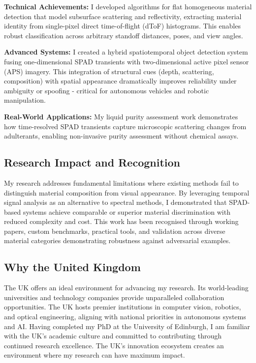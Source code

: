 \documentclass[12pt,a4paper]{article}
\begin{document}
\textbf{Technical Achievements:} I developed algorithms for flat homogeneous material detection that model subsurface scattering and reflectivity, extracting material identity from single-pixel direct time-of-flight (dToF) histograms. This enables robust classification across arbitrary standoff distances, poses, and view angles.

\textbf{Advanced Systems:} I created a hybrid spatiotemporal object detection system fusing one-dimensional SPAD transients with two-dimensional active pixel sensor (APS) imagery. This integration of structural cues (depth, scattering, composition) with spatial appearance dramatically improves reliability under ambiguity or spoofing - critical for autonomous vehicles and robotic manipulation.

\textbf{Real-World Applications:} My liquid purity assessment work demonstrates how time-resolved SPAD transients capture microscopic scattering changes from adulterants, enabling non-invasive purity assessment without chemical assays.

\subsection*{Research Impact and Recognition}

My research addresses fundamental limitations where existing methods fail to distinguish material composition from visual appearance. By leveraging temporal signal analysis as an alternative to spectral methods, I demonstrated that SPAD-based systems achieve comparable or superior material discrimination with reduced complexity and cost. This work has been recognised through working papers, custom benchmarks, practical tools, and validation across diverse material categories demonstrating robustness against adversarial examples.

\subsection*{Why the United Kingdom}

The UK offers an ideal environment for advancing my research. Its world-leading universities and technology companies provide unparalleled collaboration opportunities. The UK hosts premier institutions in computer vision, robotics, and optical engineering, aligning with national priorities in autonomous systems and AI. Having completed my PhD at the University of Edinburgh, I am familiar with the UK's academic culture and committed to contributing through continued research excellence. The UK's innovation ecosystem creates an environment where my research can have maximum impact.
\end{document}
